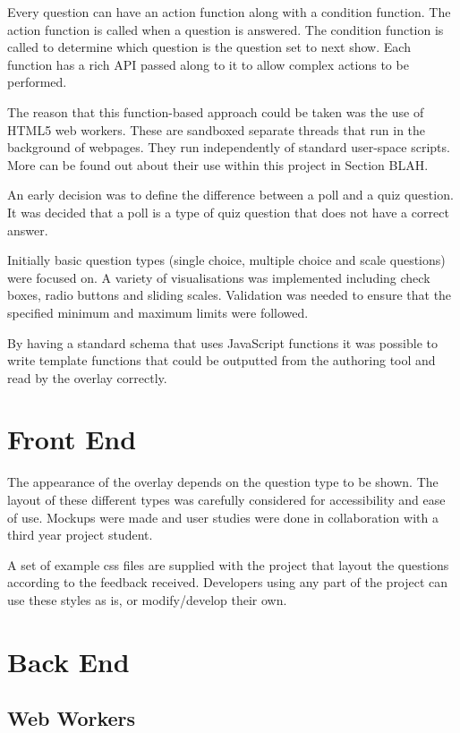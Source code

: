 Every question can have an action function along with a condition function. The
action function is called when a question is answered. The condition function
is called to determine which question is the question set to next show. Each
function has a rich API passed along to it to allow complex actions to be
performed.

The reason that this function-based approach could be taken was the use of
HTML5 web workers. These are sandboxed separate threads that run in the
background of webpages. They run independently of standard user-space scripts.
More can be found out about their use within this project in Section BLAH.

An early decision was to define the difference between a poll and a quiz
question. It was decided that a poll is a type of quiz question that does not
have a correct answer.

Initially basic question types (single choice, multiple choice and scale
questions) were focused on. A variety of visualisations was implemented
including check boxes, radio buttons and sliding scales. Validation was needed
to ensure that the specified minimum and maximum limits were followed.

By having a standard schema that uses JavaScript functions it was possible to
write template functions that could be outputted from the authoring tool and
read by the overlay correctly.

\section{Front End}
\label{Section:Front end}

The appearance of the overlay depends on the question type to be shown. The
layout of these different types was carefully considered for accessibility and
ease of use. Mockups were made and user studies were done in collaboration with
a third year project student.

A set of example css files are supplied with the project that layout the
questions according to the feedback received. Developers using any part of the
project can use these styles as is, or modify/develop their own.

\section{Back End}
\label{Section:Back end}

\subsection{Web Workers}
\label{Subsection:WebWorkers}

